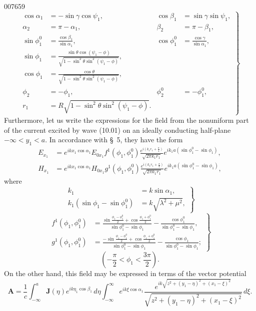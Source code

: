 \begin{scanpage}{0076}{59}
\[\left.\begin{aligned}\cos\alpha_1&=-\sin\gamma\cos\psi_1,&\cos\beta_1&=\sin\gamma\sin\psi_1,\\\alpha_2&=\pi-\alpha_1,&\beta_2&=\pi-\beta_1,\\\sin\phi_1^0&=\frac{\cos\beta_1}{\sin\alpha_1},&\cos\phi_1^0&=\frac{\cos\gamma}{\sin\alpha_1},\\\sin\phi_1&=\frac{\sin\theta\cos(\psi_1-\phi)}{\sqrt{1-\sin^2\theta\sin^2(\psi_1-\phi)}},\\\cos\phi_1&=\frac{\cos\theta}{\sqrt{1-\sin^2\theta\sin^2(\psi_1-\phi)}},\\\phi_2&=-\phi_1,&\phi_2^0&=-\phi_1^0,\\r_1&=R\sqrt{1-\sin^2\theta\sin^2(\psi_1-\phi)}.\end{aligned}\right\}\tag{11.06}\]
Furthermore, let us write the expressions for the field from the nonuniform part of the current excited by wave (10.01) on an ideally conducting half-plane $-\infty<y_1<a$. In accordance with \S\ 5, they have the form
\[\begin{aligned}E_{x_1}&=e^{ikx_1\cos\alpha_1}E_{0x_1}f^1(\phi_1,\phi_1^0)\frac{e^{i(k_1r_1+\frac\pi4)}}{\sqrt{2\pi k_1r_1}}e^{ik_1a(\sin\phi_1^0-\sin\phi_1)},\\H_{x_1}&=e^{ikx_1\cos\alpha_1}H_{0x_1}g^1(\phi_1,\phi_1^0)\frac{e^{i(k_1r_1+\frac\pi4)}}{\sqrt{2\pi k_1r_1}}e^{ik_1a(\sin\phi_1^0-\sin\phi_1)},\end{aligned}\tag{11.07}\]
where
\[\left.\begin{aligned}k_1&=k\sin\alpha_1,\\k_1(\sin\phi_1-\sin\phi_1^0)&=k\sqrt{\lambda^2+\mu^2},\end{aligned}\right\}\tag{11.08}\]
\[\left.\begin{aligned}f^1(\phi_1,\phi_1^0)&=\frac{\sin\frac{\phi_1-\phi_1^0}2+\cos\frac{\phi_1+\phi_1^0}2}{\sin\phi_1^0-\sin\phi_1}-\frac{\cos\phi_1^0}{\sin\phi_1^0-\sin\phi_1},\\g^1(\phi_1,\phi_1^0)&=\frac{-\sin\frac{\phi_1-\phi_1^0}2+\cos\frac{\phi_1+\phi_1^0}2}{\sin\phi_1^0-\sin\phi_1}-\frac{\cos\phi_1}{\sin\phi_1^0-\sin\phi_1};\end{aligned}\right\}\tag{11.09}\]
\[\left(-\frac\pi2<\phi_1<\frac{3\pi}2\right).\]
On the other hand, this field may be expressed in terms of the vector potential
\[\mathbf A=\frac1c\int_{-\infty}^a\mathbf J(\eta)e^{ik\eta_1\cos\beta_1}\,d\eta\int_{-\infty}^{\infty}e^{ik\xi\cos\alpha_1}\frac{e^{ik\sqrt{z^2+(y_1-\eta)^2+(x_1-\xi)^2}}}{\sqrt{z^2+(y_1-\eta)^2+(x_1-\xi)^2}}\,d\xi.\tag{11.10}\]
\end{scanpage}
